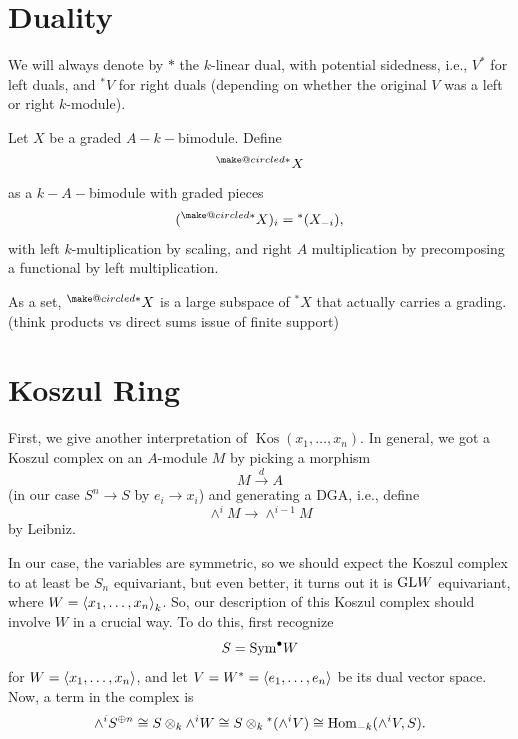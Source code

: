 \documentclass[12pt]{article}
\makeatletter
\DeclareMathOperator{\Kos}{Kos}
\newcommand{\ostar}{{\mathbin{\mathpalette\make@circled{*}}}}
\newcommand{\make@circled}[2]{%
  \ooalign{$\m@th#1\smallbigcirc{#1}$\cr\hidewidth$\m@th#1#2$\hidewidth\cr}%
}
\newcommand{\smallbigcirc}[1]{%
  \vcenter{\hbox{\scalebox{0.7}{$\m@th#1\bigcirc$}}}%
}
\makeatother
\begin{document}
\section{Duality}

We will always denote by $*$ the $k$-linear dual, with potential sidedness, i.e., $V^*$ for left duals, and ${}^* V$ for right duals (depending on whether the original $V$ was a left or right $k$-module).

Let $X$ be a graded $A{-}k{-}$bimodule. Define
\[{}^\ostar X\]
as a $k-A-$bimodule with graded pieces
\[({}^\ostar X)_i = {}^*(X_{-i}),\]
with left $k$-multiplication by scaling, and right $A$ multiplication by precomposing a functional by left multiplication.

As a set, ${}^\ostar X$ is a large subspace of ${}^* X$ that actually carries a grading. (think products vs direct sums issue of finite support)



\section{Koszul Ring}

First, we give another interpretation of $\Kos(x_1,\dots,x_n)$. In general, we got a Koszul complex on an $A$-module $M$ by picking a morphism
\[M\xrightarrow{d} A\]
(in our case $S^n\to S$ by $e_i\to x_i$) and generating a DGA, i.e., define
\[\wedge^i M \to \wedge^{i-1} M\]
by Leibniz.

In our case, the variables are symmetric, so we should expect the Koszul complex to at least be $S_n$ equivariant, but even better, it turns out it is $\mathrm{GL} W$ equivariant, where $W=\left\langle x_1,\dots,x_n\right\rangle_k$. So, our description of this Koszul complex should involve $W$ in a crucial way. To do this, first recognize
\[S = \mathrm{Sym}^\bullet W\]
for $W=\left\langle x_1,\dots,x_n\right\rangle$, and let $V=W^*=\left\langle e_1,\dots,e_n\right\rangle$ be its dual vector space. Now, a term in the complex is
\[\wedge^i S^{\oplus n} \cong S \otimes_k \wedge^i W \cong S\otimes_k {}^*(\wedge^i V)\cong\mathrm{Hom}_{-k}(\wedge^i V, S).\]

\end{document}
